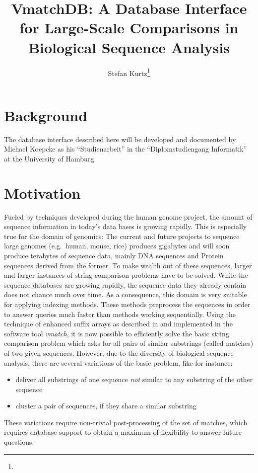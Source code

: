 \documentclass[12pt]{article}
\title{\textbf{VmatchDB: A Database Interface for Large-Scale Comparisons in
       Biological Sequence Analysis}}
\author{Stefan Kurtz\thanks{\SKaffiliation}}
\newcommand{\Vmatch}{\emph{vmatch}\xspace}
\begin{document}
\maketitle
\section{Background}
The database interface described here will be developed and documented
by Michael Koepcke as his ``Studienarbeit'' in the ``Diplomstudiengang
Informatik'' at the University of Hamburg.
\section{Motivation}
Fueled by techniques developed during the human genome project,
the amount of sequence information in today's data bases
is growing rapidly. This is especially true for the domain of genomics:
The current and future projects to sequence large genomes
(e.g.\ human, mouse, rice) produces gigabytes and will soon produce
terabytes of sequence data, mainly DNA sequences and Protein sequences 
derived from the former. To make wealth out of these sequences,
larger and larger instances of string comparison problems have to be solved.
While the sequence databases are growing rapidly, the
sequence data they already contain does not chance much over time. As a
consequence, this domain is very suitable for applying indexing methods.
These methods preprocess the sequences in order to answer queries much faster
than methods working sequentially. Using the technique of enhanced suffix
arrays as described in \cite{ABO:KUR:OHL:2002,ABO:OHL:KUR:2002} and
implemented in the software tool \Vmatch \cite{CHA:KUR:OHL:SLE:2003},
it is now possible to efficiently solve the basic string comparison problem 
which asks for all pairs of similar substrings (called matches)
of two given sequences.
However, due to the diversity of biological sequence analysis, there
are several variations of the basic problem, like for instance:
\begin{itemize}
\item
deliver all substrings of one sequence \emph{not} similar to any
substring of the other sequence
\item
cluster a pair of sequences, if they share a similar substring
\end{itemize}
These variations require non-trivial post-processing of the set of matches,
which requires database support to obtain a maximum of flexibility
to answer future questions.
\end{document}
